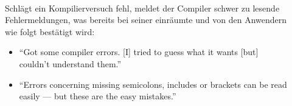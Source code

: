 \begin{itemize}
  \begin{description}
    \item[] \textbf{} \\
    Schlägt ein Kompilierversuch fehl, meldet der Compiler schwer zu lesende Fehlermeldungen, was bereits \cite{GogolDoring:2009vz} bei seiner   einräumte und von den Anwendern wie folgt bestätigt wird:
    \begin{itemize}
      \item ``Got some compiler errors. [I] tried to guess what it wants [but] couldn't understand them.''
      \item ``Errors concerning missing semicolons, includes or brackets can be read easily --- but these are the easy mistakes.''
    \end{itemize}

\end{description}
\end{itemize}
